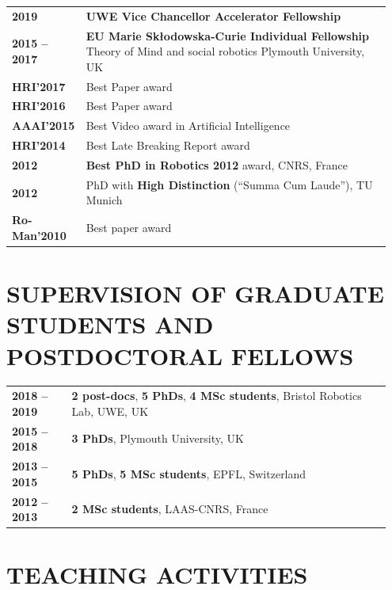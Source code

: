 \documentclass[11pt,a4paper]{report}
\begin{document}
\begin{tabular}{p{0.15\linewidth}p{0.8\linewidth}}
    \bf 2019 & {\bf UWE Vice Chancellor Accelerator Fellowship} \\
    \bf 2015 -- 2017 & {\bf EU Marie Skłodowska-Curie Individual Fellowship}
    Theory of Mind and social robotics    \newline Plymouth University, UK \\
    \bf HRI'2017  & Best Paper award\\
    \bf HRI'2016  & Best Paper award\\
    \bf AAAI'2015  & Best Video award in Artificial Intelligence\\
    \bf HRI'2014  & Best Late Breaking Report award\\
    \bf 2012         & {\bf Best PhD in Robotics 2012} award, CNRS, France \\
    \bf 2012         & PhD with {\bf High Distinction} (“Summa Cum Laude”), TU Munich\\
    \bf Ro-Man'2010  & Best paper award\\
\end{tabular}


\section{SUPERVISION OF GRADUATE STUDENTS AND POSTDOCTORAL FELLOWS}

\begin{tabular}{p{0.15\linewidth}p{0.8\linewidth}}
    \bf 2018 -- 2019 & \textbf{2 post-docs}, \textbf{5 PhDs}, \textbf{4 MSc students}, Bristol Robotics Lab, UWE, UK \\
    \bf 2015 -- 2018 & \textbf{3 PhDs}, Plymouth University, UK \\
    \bf 2013 -- 2015 & \textbf{5 PhDs}, \textbf{5 MSc students}, EPFL, Switzerland \\
    \bf 2012 -- 2013 & \textbf{2 MSc students}, LAAS-CNRS, France \\
\end{tabular}


\section{TEACHING ACTIVITIES}
\end{document}
